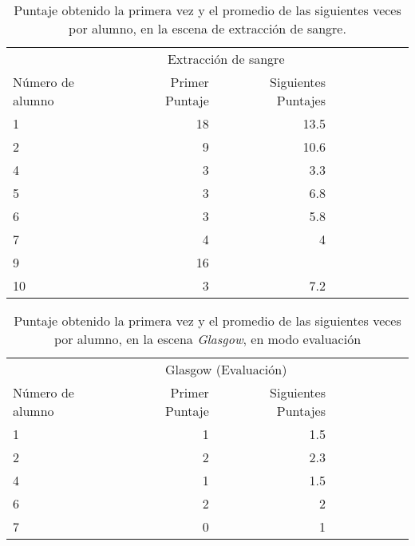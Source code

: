 \begin{table}[!hbt]
\centering
\begin{tabular}{lrrrrrrrr}
\toprule
                   & \multicolumn{2}{c}{Extracción de sangre} \\
                   \cmidrule(lr){2-3} 
Número de alumno   & Primer Puntaje                            & Siguientes Puntajes \\
\midrule
 1       & 18  & 13.5 \\
 2       & 9 & 10.6 \\
 4       & 3 & 3.3 \\
 5       & 3 & 6.8  \\
 6       & 3 & 5.8 \\
 7       & 4 & 4 \\
 9       & 16  &  \\
10       & 3 & 7.2 \\
\bottomrule
\end{tabular}
\caption{Puntaje obtenido la primera vez y el promedio de las siguientes veces
    por alumno, en la escena de extracción de sangre.}
\label{tab:log_hemocultivo_puntaje}
\end{table}


\begin{table}[!hbt]
\centering
\begin{tabular}{lrrrrrrrr}
\toprule
& \multicolumn{2}{c}{Glasgow (Evaluación)} \\
                   \cmidrule(lr){2-3} 
Número de alumno   & Primer Puntaje                            & Siguientes Puntajes \\
\midrule
1     & 1 & 1.5 \\
2     & 2 & 2.3 \\
4     & 1 & 1.5 \\
6     & 2 & 2 \\
7     & 0 & 1 \\
\bottomrule
\end{tabular}
\caption{Puntaje obtenido la primera vez y el promedio de las siguientes veces
    por alumno, en la escena \textit{Glasgow}, en modo evaluación}
\label{tab:log_glasgow_random_puntaje}
\end{table}

